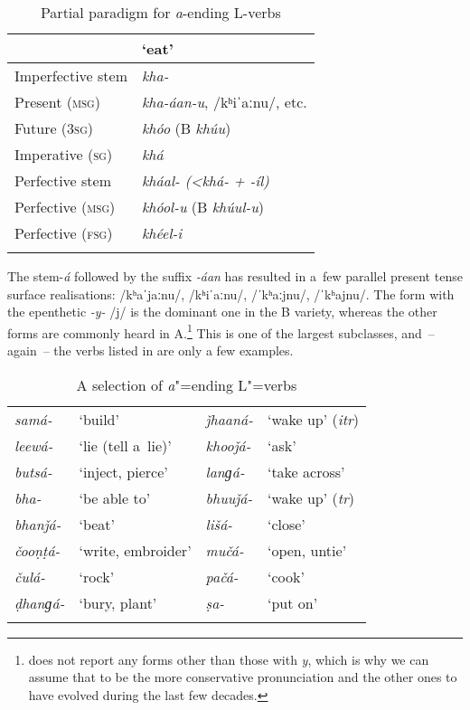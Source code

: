 \begin{table}[t]
\caption{Partial paradigm for \textit{a}-ending L-verbs}
\begin{tabularx}{.75\textwidth}{ Q Q }
\lsptoprule
&
`eat'\\\midrule
Imperfective stem &
\textit{kha-} \\
Present (\textsc{msg}) &
\textit{kha-áan-u}, /kʰiˈaːnu/, etc.\\
Future (\textsc{3sg}) &
\textit{khóo} (B \textit{khúu})\\
Imperative (\textsc{sg}) &
\textit{khá} \\
Perfective stem &
\textit{kháal- ({\textless}khá- + -íl)}\\
Perfective (\textsc{msg}) &
\textit{khóol-u} (B \textit{khúul-u})\\
Perfective (\textsc{fsg}) &
\textit{khéel-i} \\\lspbottomrule
\end{tabularx}
\label{tab:8-5}
\end{table}


The stem-\textit{á} followed by the suffix \textit{-áan} has resulted in a~few parallel present tense surface realisations: /kʰaˈjaːnu/, /kʰiˈaːnu/, /ˈkʰaːjnu/, /ˈkʰajnu/. The form with the epenthetic \textit{-y-} /j/ is the dominant one in the B variety, whereas the other forms are commonly heard in A.\footnote{\citet[22]{morgenstierne1941} does not report any forms other than those with \textit{y}, which is why we can assume that to be the more conservative pronunciation and the other ones to have evolved during the last few decades.} This is one of the largest subclasses, and~-- again~-- the verbs listed in  are only a few examples.


\begin{table}[h]
\caption{A selection of \textit{a}"=ending L"=verbs}
\begin{tabularx}{\textwidth}{ l@{\hspace{20pt}} Q l@{\hspace{20pt}} Q }
\lsptoprule
\textit{samá-} &
`build' &
\textit{ǰhaaná-} &
`wake up' (\textit{itr})\\
\textit{leewá-} &
`lie (tell a~lie)' &
\textit{khooǰá-} &
`ask'\\
\textit{butsá-} &
`inject, pierce' &
\textit{lanɡá-} &
`take across'\\
\textit{bha-} &
`be able to' &
\textit{bhuuǰá-} &
`wake up' (\textit{tr})\\
\textit{bhanǰá-} &
`beat' &
\textit{lišá-} &
`close'\\
\textit{čooṇṭá-} &
`write, embroider' &
\textit{mučá-} &
`open, untie'\\
\textit{čulá-} &
`rock' &
\textit{pačá-} &
`cook'\\
\textit{ḍhanɡá-} &
`bury, plant' &
\textit{ṣa-} &
`put on'\\\lspbottomrule
\end{tabularx}
\label{tab:8-la}
\end{table}

